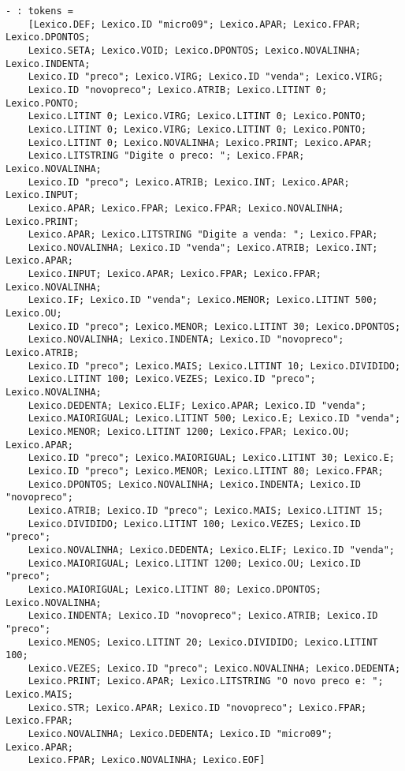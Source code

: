 \documentclass[hidelinks,12pt]{article}
\begin{document}
	\begin{lstlisting}[caption=Analisador Léxico]
	- : tokens =
	[Lexico.DEF; Lexico.ID "micro09"; Lexico.APAR; Lexico.FPAR; Lexico.DPONTOS;
	Lexico.SETA; Lexico.VOID; Lexico.DPONTOS; Lexico.NOVALINHA; Lexico.INDENTA;
	Lexico.ID "preco"; Lexico.VIRG; Lexico.ID "venda"; Lexico.VIRG;
	Lexico.ID "novopreco"; Lexico.ATRIB; Lexico.LITINT 0; Lexico.PONTO;
	Lexico.LITINT 0; Lexico.VIRG; Lexico.LITINT 0; Lexico.PONTO;
	Lexico.LITINT 0; Lexico.VIRG; Lexico.LITINT 0; Lexico.PONTO;
	Lexico.LITINT 0; Lexico.NOVALINHA; Lexico.PRINT; Lexico.APAR;
	Lexico.LITSTRING "Digite o preco: "; Lexico.FPAR; Lexico.NOVALINHA;
	Lexico.ID "preco"; Lexico.ATRIB; Lexico.INT; Lexico.APAR; Lexico.INPUT;
	Lexico.APAR; Lexico.FPAR; Lexico.FPAR; Lexico.NOVALINHA; Lexico.PRINT;
	Lexico.APAR; Lexico.LITSTRING "Digite a venda: "; Lexico.FPAR;
	Lexico.NOVALINHA; Lexico.ID "venda"; Lexico.ATRIB; Lexico.INT; Lexico.APAR;
	Lexico.INPUT; Lexico.APAR; Lexico.FPAR; Lexico.FPAR; Lexico.NOVALINHA;
	Lexico.IF; Lexico.ID "venda"; Lexico.MENOR; Lexico.LITINT 500; Lexico.OU;
	Lexico.ID "preco"; Lexico.MENOR; Lexico.LITINT 30; Lexico.DPONTOS;
	Lexico.NOVALINHA; Lexico.INDENTA; Lexico.ID "novopreco"; Lexico.ATRIB;
	Lexico.ID "preco"; Lexico.MAIS; Lexico.LITINT 10; Lexico.DIVIDIDO;
	Lexico.LITINT 100; Lexico.VEZES; Lexico.ID "preco"; Lexico.NOVALINHA;
	Lexico.DEDENTA; Lexico.ELIF; Lexico.APAR; Lexico.ID "venda";
	Lexico.MAIORIGUAL; Lexico.LITINT 500; Lexico.E; Lexico.ID "venda";
	Lexico.MENOR; Lexico.LITINT 1200; Lexico.FPAR; Lexico.OU; Lexico.APAR;
	Lexico.ID "preco"; Lexico.MAIORIGUAL; Lexico.LITINT 30; Lexico.E;
	Lexico.ID "preco"; Lexico.MENOR; Lexico.LITINT 80; Lexico.FPAR;
	Lexico.DPONTOS; Lexico.NOVALINHA; Lexico.INDENTA; Lexico.ID "novopreco";
	Lexico.ATRIB; Lexico.ID "preco"; Lexico.MAIS; Lexico.LITINT 15;
	Lexico.DIVIDIDO; Lexico.LITINT 100; Lexico.VEZES; Lexico.ID "preco";
	Lexico.NOVALINHA; Lexico.DEDENTA; Lexico.ELIF; Lexico.ID "venda";
	Lexico.MAIORIGUAL; Lexico.LITINT 1200; Lexico.OU; Lexico.ID "preco";
	Lexico.MAIORIGUAL; Lexico.LITINT 80; Lexico.DPONTOS; Lexico.NOVALINHA;
	Lexico.INDENTA; Lexico.ID "novopreco"; Lexico.ATRIB; Lexico.ID "preco";
	Lexico.MENOS; Lexico.LITINT 20; Lexico.DIVIDIDO; Lexico.LITINT 100;
	Lexico.VEZES; Lexico.ID "preco"; Lexico.NOVALINHA; Lexico.DEDENTA;
	Lexico.PRINT; Lexico.APAR; Lexico.LITSTRING "O novo preco e: "; Lexico.MAIS;
	Lexico.STR; Lexico.APAR; Lexico.ID "novopreco"; Lexico.FPAR; Lexico.FPAR;
	Lexico.NOVALINHA; Lexico.DEDENTA; Lexico.ID "micro09"; Lexico.APAR;
	Lexico.FPAR; Lexico.NOVALINHA; Lexico.EOF]
	\end{lstlisting}
	
\end{document}
